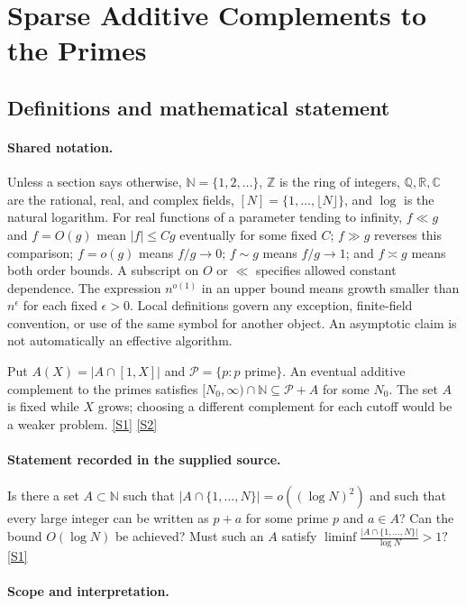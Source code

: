 \documentclass[11pt,a4paper]{article}
\newcommand{\N}{\mathbb{N}}
\newcommand{\Z}{\mathbb{Z}}
\newcommand{\Q}{\mathbb{Q}}
\newcommand{\R}{\mathbb{R}}
\newcommand{\C}{\mathbb{C}}
\newcommand{\sref}[2]{\hyperlink{source:#1:#2}{[S#2]}}
\begin{document}
\section{Sparse Additive Complements to the Primes}\label{statement}


\subsection{Definitions and mathematical statement}

\paragraph{Shared notation.}Unless a section says otherwise, $\N=\{1,2,\ldots\}$,
$\Z$ is the ring of integers, $\Q,\R,\C$ are the rational, real, and complex
fields, $[N]=\{1,\ldots,\lfloor N\rfloor\}$, and $\log$ is the natural
logarithm. For real functions of a parameter tending to infinity,
$f\ll g$ and $f=O(g)$ mean $|f|\leq Cg$ eventually for some fixed $C$;
$f\gg g$ reverses this comparison; $f=o(g)$ means $f/g\to0$;
$f\sim g$ means $f/g\to1$; and $f\asymp g$ means both order bounds.
A subscript on $O$ or $\ll$ specifies allowed constant dependence.
The expression $n^{o(1)}$ in an upper bound means growth smaller than
$n^\epsilon$ for each fixed $\epsilon>0$. Local definitions govern any
exception, finite-field convention, or use of the same symbol for another
object. An asymptotic claim is not automatically an effective algorithm.



Put $A(X)=|A\cap[1,X]|$ and $\mathcal P=\{p:p\text{ prime}\}$. An eventual additive complement to the primes satisfies $[N_0,\infty)\cap\N\subseteq\mathcal P+A$ for some $N_0$. The set $A$ is fixed while $X$ grows; choosing a different complement for each cutoff would be a weaker problem. \sref{statement}{1} \sref{statement}{2}

\paragraph{Statement recorded in the supplied source.}
Is there a set $A\subset\mathbb{N}$ such that $ \lvert A\cap\{1,\ldots,N\}\rvert = o((\log N)^2) $ and such that every large integer can be written as $p+a$ for some prime $p$ and $a\in A$?
Can the bound $O(\log N)$ be achieved? Must such an $A$ satisfy $ \liminf \frac{\lvert A\cap\{1,\ldots,N\}\rvert}{\log N}> 1? $ \sref{statement}{1}

\paragraph{Scope and interpretation.}
\end{document}
